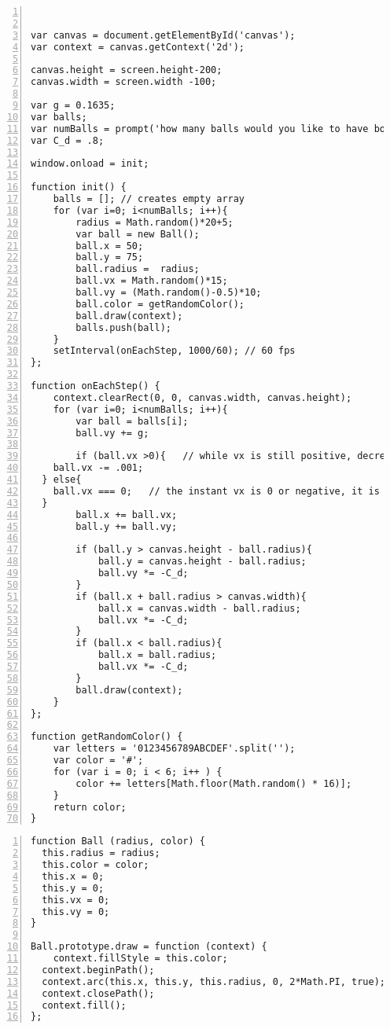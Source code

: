 \begin{lstlisting}[breaklines=true, frame=single, numbers=left, caption=Multiple Balls Bouncing Simulation label=lst:ballsbouncing]


var canvas = document.getElementById('canvas');
var context = canvas.getContext('2d'); 

canvas.height = screen.height-200;
canvas.width = screen.width -100;

var g = 0.1635;
var balls;
var numBalls = prompt('how many balls would you like to have bounce?'); 
var C_d = .8;
 
window.onload = init; 
 
function init() {
	balls = []; // creates empty array
	for (var i=0; i<numBalls; i++){
		radius = Math.random()*20+5;
		var ball = new Ball();	
		ball.x = 50;
		ball.y = 75;
		ball.radius =  radius;
		ball.vx = Math.random()*15;
		ball.vy = (Math.random()-0.5)*10;
		ball.color = getRandomColor();
		ball.draw(context);
		balls.push(ball);
	}  
	setInterval(onEachStep, 1000/60); // 60 fps
};
 
function onEachStep() {
	context.clearRect(0, 0, canvas.width, canvas.height); 
	for (var i=0; i<numBalls; i++){
		var ball = balls[i];
		ball.vy += g;     

		if (ball.vx >0){   // while vx is still positive, decrease it incrementally to represent air resistance/friction
    ball.vx -= .001;
  } else{
    ball.vx === 0;   // the instant vx is 0 or negative, it is set to 0 to stop the movement in x direction
  }
		ball.x += ball.vx; 
		ball.y += ball.vy; 
			
		if (ball.y > canvas.height - ball.radius){ 
			ball.y = canvas.height - ball.radius; 
			ball.vy *= -C_d; 
		}
		if (ball.x + ball.radius > canvas.width){
			ball.x = canvas.width - ball.radius; 
			ball.vx *= -C_d;
		}
		if (ball.x < ball.radius){
			ball.x = ball.radius;
			ball.vx *= -C_d;
		}
		ball.draw(context); 
	} 
};

function getRandomColor() {
    var letters = '0123456789ABCDEF'.split('');
    var color = '#';
    for (var i = 0; i < 6; i++ ) {
        color += letters[Math.floor(Math.random() * 16)];
    }
    return color;
}

\end{lstlisting}

\vspace{2cm}

\begin{lstlisting}[breaklines=true, frame=single, numbers=left, caption=Ball.js file used for prototype ball object label=lst:ballprototype]
function Ball (radius, color) {
  this.radius = radius;
  this.color = color;
  this.x = 0;
  this.y = 0;
  this.vx = 0;
  this.vy = 0;
}

Ball.prototype.draw = function (context) {
	context.fillStyle = this.color;
  context.beginPath();
  context.arc(this.x, this.y, this.radius, 0, 2*Math.PI, true);
  context.closePath();
  context.fill();  
};
\end{lstlisting}

